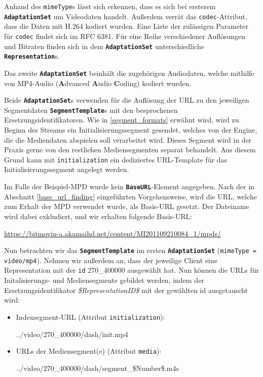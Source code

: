 \documentclass[paper = a4, fontsize = 12pt, parskip = half]{scrartcl} %
\def\attr#1{\texttt{#1}}
\def\elem#1{\texttt{\textbf{#1}}}
\begin{document}
Anhand des \attr{mimeType}s lässt sich erkennen, dass es sich bei ersterem \elem{AdaptationSet} um Videodaten handelt. Außerdem verrät das \attr{codec}-Attribut, dass die Daten mit H.264 kodiert wurden. Eine Liste der zulässigen Parameter für \attr{codec} findet sich im RFC 6381. Für eine Reihe verschiedener Auflösungen und Bitraten finden sich in dem \elem{AdaptationSet} unterschiedliche \elem{Representation}s.

Das zweite \elem{AdaptationSet} beinhält die zugehörigen Audiodaten, welche mithilfe von MP4-Audio (\textbf{A}dvanced \textbf{A}udio \textbf{C}oding) kodiert wurden.

Beide \elem{AdaptationSet}s verwenden für die Auflösung der URL zu den jeweiligen Segmentdaten \elem{SegmentTemplate}s mit den besprochenen Ersetzungsidentifikatoren. Wie in \ref{segment_formats} erwähnt wird, wird zu Beginn des Streams ein Initialisierungssegment gesendet, welches von der Engine, die die Mediendaten abspielen soll verarbeitet wird. Dieses Segment wird in der Praxis gerne von den restlichen Mediensegmenten separat behandelt. Aus diesem Grund kann mit \attr{initialization} ein dediziertes URL-Template für das Initialisierungssegment angelegt werden.

Im Falle der Beispiel-MPD wurde kein \elem{BaseURL}-Element angegeben. Nach der in Abschnitt \ref{base_url_finding} eingeführten Vorgehensweise, wird die URL, welche zum Erhalt der MPD verwendet wurde, als Basis-URL gesetzt. Der Dateiname wird dabei exkludiert, und wir erhalten folgende Basis-URL:

\begin{center}
	\url{https://bitmovin-a.akamaihd.net/content/MI201109210084_1/mpds/}
\end{center}

Nun betrachten wir das \elem{SegmentTemplate} im ersten \elem{AdaptationSet} (\attr{mimeType = video/mp4}). Nehmen wir außerdem an, dass der jeweilige Client eine Representation mit der \attr{id} 270\_400000 ausgewählt hat. Nun können die URLs für Initalisierungs- und Mediensegmente gebildet werden, indem der Ersetzungsidentifikator \textit{\$RepresentationID\$} mit der gewählten id ausgetauscht wird:

\begin{itemize}
	\item Indexsegment-URL (Attribut \attr{initialization}): 
	
	../video/270\_400000/dash/init.mp4

	\item URLs der Mediensegment(e) (Attribut \attr{media}):
	
	../video/270\_400000/dash/segment\_\$Number\$.m4s
\end{itemize}
\end{document}
